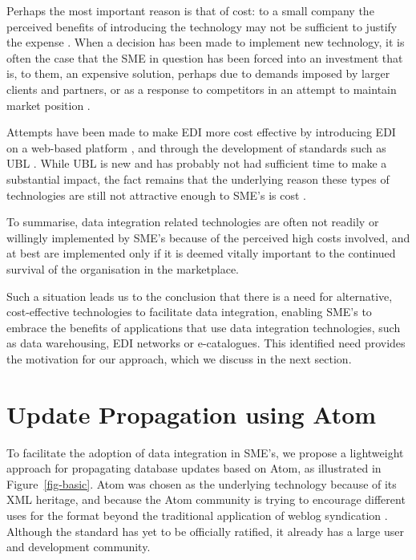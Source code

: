 \documentclass{CRPITStyle}
\begin{document}
Perhaps the most important reason is that of cost: to a small company
the perceived benefits of introducing the technology may not be
sufficient to justify the expense
\cite{Beck-R-2002-Bled,Guo-J-2003-DocEng,Somm-RA-2002-SIGMOD}. When a
decision has been made to implement new technology, it is often the case
that the SME in question has been forced into an investment that is, to
them, an expensive solution, perhaps due to demands imposed by larger
clients and partners, or as a response to competitors in an attempt to
maintain market position \cite{Beck-R-2002-Bled,vaHe-E-1999-EDI}.

Attempts have been made to make EDI more cost effective by introducing
EDI on a web-based platform \cite{Beck-R-2002-Bled}, and through the
development of standards such as UBL \cite{Mead-B-2004-UBL}. While UBL
is new and has probably not had sufficient time to make a substantial
impact, the fact remains that the underlying reason these types of
technologies are still not attractive enough to SME's is cost
\cite{Beck-R-2002-Bled,Guo-J-2003-DocEng,Somm-RA-2002-SIGMOD,vaHe-E-1999-EDI}.

To summarise, data integration related technologies are often not
readily or willingly implemented by SME's because of the perceived high
costs involved, and at best are implemented only if it is deemed vitally
important to the continued survival of the organisation in the
marketplace.

Such a situation leads us to the conclusion that there is a need for
alternative, cost-effective technologies to facilitate data integration,
enabling SME's to embrace the benefits of applications that use data
integration technologies, such as data warehousing, EDI networks or
e-catalogues. This identified need provides the motivation for our
approach, which we discuss in the next section.


\section{Update Propagation using Atom}
\label{sec-architecture}

To facilitate the adoption of data integration in SME's, we propose a
lightweight approach for propagating database updates based on Atom,
as illustrated in Figure~\ref{fig-basic}. Atom was chosen as the
underlying technology because of its XML heritage, and because the Atom
community is trying to encourage different uses for the format beyond
the traditional application of weblog syndication
\cite{Nott-M-2005-Atom}. Although the standard has yet to be officially
ratified, it already has a large user and development community.
\end{document}
